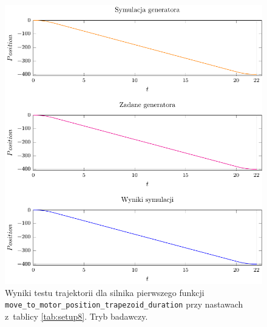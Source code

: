 \documentclass[a4paper, 12pt]{article}
\begin{document}
	\begin{figure}[H]
		\centering
		\includegraphics[scale=1.2]{raport_graphs/simpMPDRrevers.pdf}
		\caption{Wyniki testu trajektorii dla silnika pierwszego funkcji \texttt{move\_to\_motor\_position\_trapezoid\_duration} przy nastawach z~tablicy \ref{tab:setup8}. Tryb badawczy.}
		\label{fig:simpMPDRrevers}
	\end{figure}
		
\end{document}

